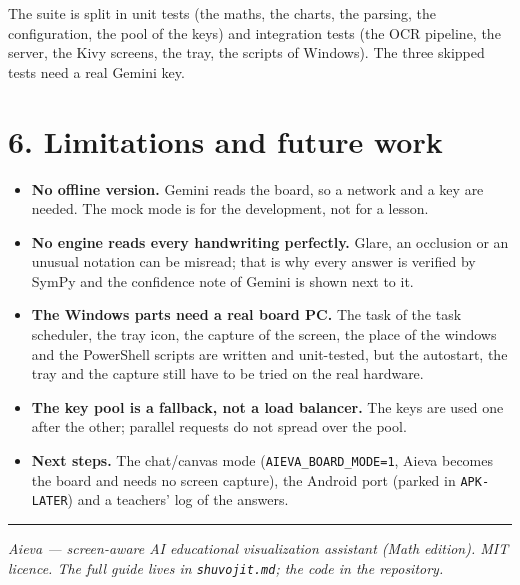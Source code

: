 \documentclass[10pt,a4paper]{article}
\begin{document}
The suite is split in unit tests (the maths, the charts, the parsing, the
configuration, the pool of the keys) and integration tests (the OCR pipeline,
the server, the Kivy screens, the tray, the scripts of Windows). The three
skipped tests need a real Gemini key.

\section*{6. Limitations and future work}

\begin{itemize}
\item \textbf{No offline version.} Gemini reads the board, so a network and a
      key are needed. The mock mode is for the development, not for a lesson.
\item \textbf{No engine reads every handwriting perfectly.} Glare, an
      occlusion or an unusual notation can be misread; that is why every
      answer is verified by SymPy and the confidence note of Gemini is shown
      next to it.
\item \textbf{The Windows parts need a real board PC.} The task of the task
      scheduler, the tray icon, the capture of the screen, the place of the
      windows and the PowerShell scripts are written and unit-tested, but the
      autostart, the tray and the capture still have to be tried on the real
      hardware.
\item \textbf{The key pool is a fallback, not a load balancer.} The keys are
      used one after the other; parallel requests do not spread over the pool.
\item \textbf{Next steps.} The chat/canvas mode (\texttt{AIEVA\_BOARD\_MODE=1},
      Aieva becomes the board and needs no screen capture), the Android port
      (parked in \texttt{APK-LATER}) and a teachers' log of the answers.
\end{itemize}

\vfill
\hrule\vspace{3pt}
{\footnotesize\itshape Aieva --- screen-aware AI educational visualization
assistant (Math edition). MIT licence. The full guide lives in
\texttt{shuvojit.md}; the code in the repository.}
\end{document}
